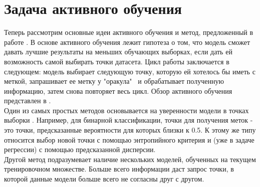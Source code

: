 \documentclass{llncs}
\begin{document}
\section{Задача активного обучения}
Теперь рассмотрим основные идеи активного обучения и метод, предложенный в работе \cite{av}. В основе активного обучения лежит гипотеза о том, что модель сможет давать лучшие результаты на меньших обучающих выборках, если дать ей возможность самой выбирать точки датасета. Цикл работы заключается в следующем: модель выбирает следующую точку, которую ей хотелось бы иметь с меткой, запрашивает ее метку у "оракула" \ и обрабатывает полученную информацию, затем снова повторяет весь цикл. Обзор активного обучения представлен в \cite{generalav}.\\ 
Один из самых простых методов основывается на уверенности модели в точках выборки \cite{uncertainty}. Например, для бинарной классификации, точки для получения меток - это точки, предсказанные вероятности для которых близки к 0.5. К этому же типу относится выбор новой точки с помощью энтропийного критерия и (уже в задаче регрессии) с помощью предсказанной дисперсии.\\
Другой метод \cite{comitee} подразумевает наличие нескольких моделей, обученных на текущем тренировочном множестве. Больше всего информации даст запрос точки, в которой данные модели больше всего не согласны друг с другом.
\end{document}
